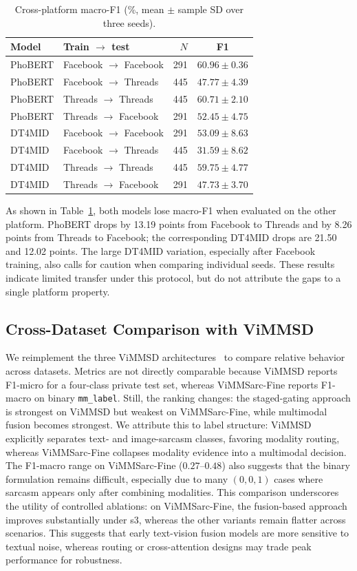 \documentclass[conference]{IEEEtran}
\begin{document}
\begin{table}[t]
\centering
\scriptsize
\setlength{\tabcolsep}{2.3pt}
\begin{tabular}{llrc}
\toprule
\textbf{Model} & \textbf{Train $\rightarrow$ test} & $N$ & \textbf{F1} \\
\midrule
PhoBERT & Facebook $\rightarrow$ Facebook & 291 & $60.96\pm0.36$ \\
PhoBERT & Facebook $\rightarrow$ Threads & 445 & $47.77\pm4.39$ \\
PhoBERT & Threads $\rightarrow$ Threads & 445 & $60.71\pm2.10$ \\
PhoBERT & Threads $\rightarrow$ Facebook & 291 & $52.45\pm4.75$ \\
DT4MID & Facebook $\rightarrow$ Facebook & 291 & $53.09\pm8.63$ \\
DT4MID & Facebook $\rightarrow$ Threads & 445 & $31.59\pm8.62$ \\
DT4MID & Threads $\rightarrow$ Threads & 445 & $59.75\pm4.77$ \\
DT4MID & Threads $\rightarrow$ Facebook & 291 & $47.73\pm3.70$ \\
\bottomrule
\end{tabular}
\caption{Cross-platform macro-F1 (\%, mean $\pm$ sample SD over three seeds).}
\label{tab:cross-platform-results}
\end{table}

As shown in Table~\ref{tab:cross-platform-results}, both models lose macro-F1 when evaluated on the other platform. PhoBERT drops by 13.19 points from Facebook to Threads and by 8.26 points from Threads to Facebook; the corresponding DT4MID drops are 21.50 and 12.02 points. The large DT4MID variation, especially after Facebook training, also calls for caution when comparing individual seeds. These results indicate limited transfer under this protocol, but do not attribute the gaps to a single platform property.
\subsection{Cross-Dataset Comparison with ViMMSD}
We reimplement the three ViMMSD architectures~\cite{10.1007/978-981-96-8892-0_31} to compare relative behavior across datasets. Metrics are not directly comparable because ViMMSD reports F1-micro for a four-class private test set, whereas ViMMSarc-Fine reports F1-macro on binary \texttt{mm\_label}. Still, the ranking changes: the staged-gating approach is strongest on ViMMSD but weakest on ViMMSarc-Fine, while multimodal fusion becomes strongest. We attribute this to label structure: ViMMSD explicitly separates text- and image-sarcasm classes, favoring modality routing, whereas ViMMSarc-Fine collapses modality evidence into a multimodal decision. The F1-macro range on ViMMSarc-Fine ($0.27$--$0.48$) also suggests that the binary formulation remains difficult, especially due to many \((0,0,1)\) cases where sarcasm appears only after combining modalities.
This comparison underscores the utility of controlled ablations: on ViMMSarc-Fine, the fusion-based approach improves substantially under s3, whereas the other variants remain flatter across scenarios. This suggests that early text-vision fusion models are more sensitive to textual noise, whereas routing or cross-attention designs may trade peak performance for robustness.
\end{document}
